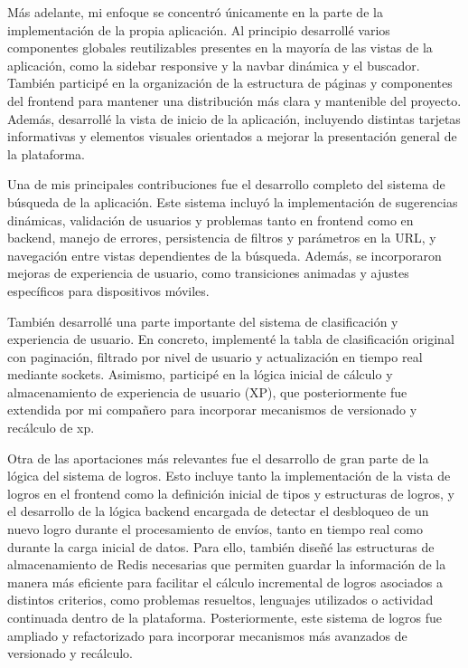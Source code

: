 Más adelante, mi enfoque se concentró únicamente en la parte de la implementación de la propia aplicación. Al principio desarrollé varios componentes globales reutilizables presentes en la mayoría de las vistas de la aplicación, como la sidebar responsive y la navbar dinámica y el buscador. También participé en la organización de la estructura de páginas y componentes del frontend para mantener una distribución más clara y mantenible del proyecto. Además, desarrollé la vista de inicio de la aplicación, incluyendo distintas tarjetas informativas y elementos visuales orientados a mejorar la presentación general de la plataforma.

Una de mis principales contribuciones fue el desarrollo completo del sistema de búsqueda de la aplicación. Este sistema incluyó la implementación de sugerencias dinámicas, validación de usuarios y problemas tanto en frontend como en backend, manejo de errores, persistencia de filtros y parámetros en la URL, y navegación entre vistas dependientes de la búsqueda. Además, se incorporaron mejoras de experiencia de usuario, como transiciones animadas y ajustes específicos para dispositivos móviles.

También desarrollé una parte importante del sistema de clasificación y experiencia de usuario. En concreto, implementé la tabla de clasificación original con paginación, filtrado por nivel de usuario y actualización en tiempo real mediante sockets. Asimismo, participé en la lógica inicial de cálculo y almacenamiento de experiencia de usuario (XP), que posteriormente fue extendida por mi compañero para incorporar mecanismos de versionado y recálculo de xp.

Otra de las aportaciones más relevantes fue el desarrollo de gran parte de la lógica del sistema de logros. Esto incluye tanto la implementación de la vista de logros en el frontend como la definición inicial de tipos y estructuras de logros, y el desarrollo de la lógica backend encargada de detectar el desbloqueo de un nuevo logro durante el procesamiento de envíos, tanto en tiempo real como durante la carga inicial de datos. Para ello, también diseñé las estructuras de almacenamiento de Redis necesarias que permiten guardar la información de la manera más eficiente para facilitar el cálculo incremental de logros asociados a distintos criterios, como problemas resueltos, lenguajes utilizados o actividad continuada dentro de la plataforma. Posteriormente, este sistema de logros fue ampliado y refactorizado para incorporar mecanismos más avanzados de versionado y recálculo. 

